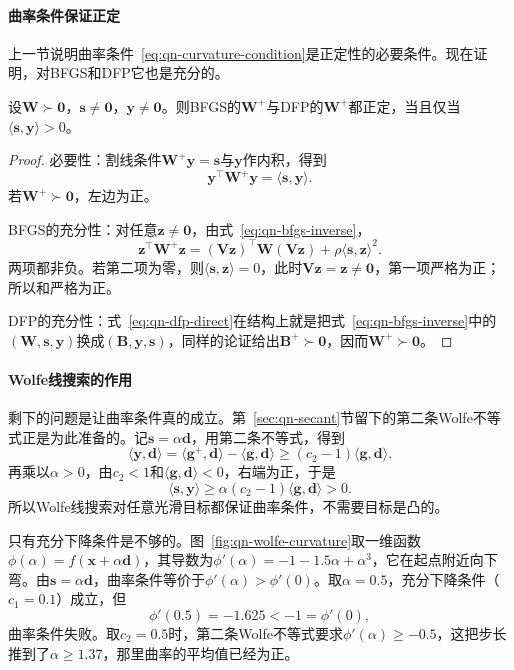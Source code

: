 \paragraph{曲率条件保证正定}
上一节说明曲率条件~\eqref{eq:qn-curvature-condition}是正定性的必要条件。现在证明，对BFGS和DFP它也是充分的。

\begin{theorem}[正定性的保持]
\label{thm:qn-positive-definite}
设$\bm{W}\succ\bm{0}$，$\bm{s}\neq\bm{0}$，$\bm{y}\neq\bm{0}$。则BFGS的$\bm{W}^{+}$与DFP的$\bm{W}^{+}$都正定，当且仅当$\langle\bm{s},\bm{y}\rangle>0$。
\end{theorem}

\begin{proof}
必要性：割线条件$\bm{W}^{+}\bm{y}=\bm{s}$与$\bm{y}$作内积，得到
\[
 \bm{y}^\top\bm{W}^{+}\bm{y}=\langle\bm{s},\bm{y}\rangle.
\]
若$\bm{W}^{+}\succ\bm{0}$，左边为正。

BFGS的充分性：对任意$\bm{z}\neq\bm{0}$，由式~\eqref{eq:qn-bfgs-inverse}，
\[
 \bm{z}^\top\bm{W}^{+}\bm{z}=(\bm{V}\bm{z})^\top\bm{W}(\bm{V}\bm{z})+\rho\langle\bm{s},\bm{z}\rangle^2.
\]
两项都非负。若第二项为零，则$\langle\bm{s},\bm{z}\rangle=0$，此时$\bm{V}\bm{z}=\bm{z}\neq\bm{0}$，第一项严格为正；所以和严格为正。

DFP的充分性：式~\eqref{eq:qn-dfp-direct}在结构上就是把式~\eqref{eq:qn-bfgs-inverse}中的$(\bm{W},\bm{s},\bm{y})$换成$(\bm{B},\bm{y},\bm{s})$，同样的论证给出$\bm{B}^{+}\succ\bm{0}$，因而$\bm{W}^{+}\succ\bm{0}$。
\end{proof}

\paragraph{Wolfe线搜索的作用}
剩下的问题是让曲率条件真的成立。第~\ref{sec:qn-secant}节留下的第二条Wolfe不等式正是为此准备的。记$\bm{s}=\alpha\bm{d}$，用第二条不等式，得到
\[
 \langle\bm{y},\bm{d}\rangle=\langle\bm{g}^{+},\bm{d}\rangle-\langle\bm{g},\bm{d}\rangle\geq(c_2-1)\langle\bm{g},\bm{d}\rangle.
\]
再乘以$\alpha>0$，由$c_2<1$和$\langle\bm{g},\bm{d}\rangle<0$，右端为正，于是
\begin{equation}
 \langle\bm{s},\bm{y}\rangle\geq\alpha(c_2-1)\langle\bm{g},\bm{d}\rangle>0.
 \label{eq:qn-wolfe-curvature}
\end{equation}
所以Wolfe线搜索对任意光滑目标都保证曲率条件，不需要目标是凸的。

只有充分下降条件是不够的。图~\ref{fig:qn-wolfe-curvature}取一维函数$\phi(\alpha)=f(\bm{x}+\alpha\bm{d})$，其导数为$\phi'(\alpha)=-1-1.5\alpha+\alpha^3$，它在起点附近向下弯。由$\bm{s}=\alpha\bm{d}$，曲率条件等价于$\phi'(\alpha)>\phi'(0)$。取$\alpha=0.5$，充分下降条件（$c_1=0.1$）成立，但
\[
 \phi'(0.5)=-1.625<-1=\phi'(0),
\]
曲率条件失败。取$c_2=0.5$时，第二条Wolfe不等式要求$\phi'(\alpha)\geq-0.5$，这把步长推到了$\alpha\geq1.37$，那里曲率的平均值已经为正。

